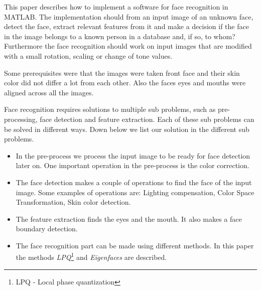 This paper describes how to implement a software for face recognition in MATLAB. The implementation should from an input image of an unknown face, detect the face, extract relevant features from it and make a decision if the face in the image belongs to a known person in a database and, if so, to whom? Furthermore the face recognition should work on input images that are modified with a small rotation, scaling or change of tone values.

Some prerequisites were that the images were taken front face and their skin color did not differ a lot from each other. Also the faces eyes and mouths were aligned across all the images.

Face recognition requires solutions to multiple sub problems, such as pre-processing, face detection and feature extraction. Each of these sub problems can be solved in different ways. Down below we list our solution in the different sub problems.

\begin{itemize}
  \item In the pre-process we process the input image to be ready for face detection later on. One important operation in the pre-process is the color correction.
  \item The face detection makes a couple of operations to find the face of the input image. Some examples of operations are: Lighting compensation, Color Space Transformation, Skin color detection.
  \item The feature extraction finds the eyes and the mouth. It also makes a face boundary detection.
  \item The face recognition part can be made using different methods. In this paper the methods \emph{LPQ}\footnote{LPQ - Local phase quantization} and \emph{Eigenfaces} are described.
\end{itemize}
